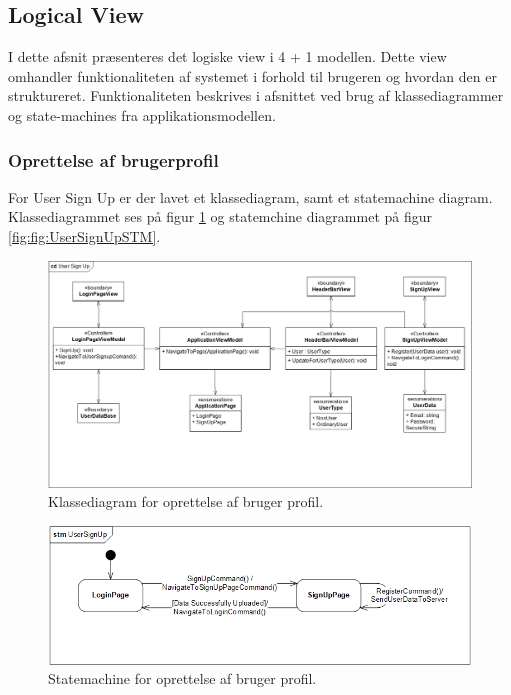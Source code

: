 \documentclass[Arkitektur/System_main.tex]{subfiles}
\begin{document}
\subsection{Logical View}
I dette afsnit præsenteres det logiske view i 4 + 1 modellen. Dette view omhandler funktionaliteten af systemet i forhold til brugeren og hvordan den er struktureret. Funktionaliteten beskrives i afsnittet ved brug af klassediagrammer og state-machines fra applikationsmodellen.

\subsubsection{Oprettelse af brugerprofil}
For User Sign Up er der lavet et klassediagram, samt et statemachine diagram. Klassediagrammet ses på figur \ref{fig:UserSignUpCD} og statemchine diagrammet på figur \ref{fig:fig:UserSignUpSTM}.
\begin{figure}[H]
    \centering
    \includegraphics[width=\textwidth]{Arkitektur/Softwarearkitektur/User_Signup/graphics/UserSignUpCD.png}
    \caption{Klassediagram for oprettelse af bruger profil. }
    \label{fig:UserSignUpCD}
\end{figure}


\begin{figure}[H]
    \centering
    \includegraphics[width=\textwidth]{Arkitektur/Softwarearkitektur/User_Signup/graphics/UserSignUpSTM.png}
    \caption{Statemachine for oprettelse af bruger profil. }
    \label{fig:UserSignUpSTM}
\end{figure}
\end{document}
